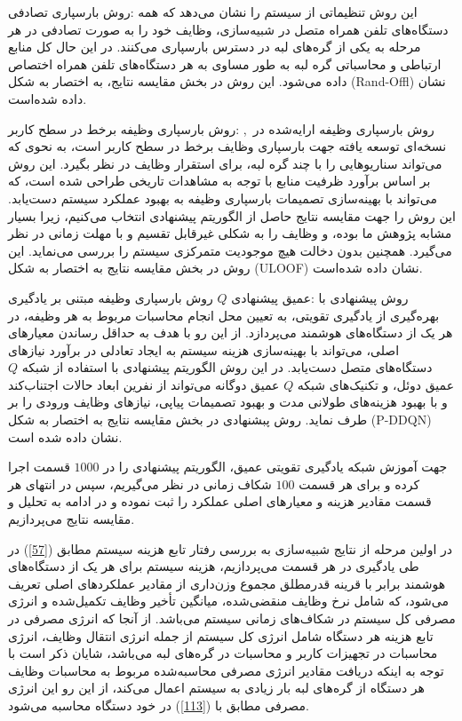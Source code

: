  $\textbf{روش بارسپاری تصادفی:}$ این روش تنظیماتی از سیستم را نشان می‌دهد که همه دستگاه‌های تلفن همراه متصل در شبیه‌سازی، وظایف خود را به صورت تصادفی در هر مرحله به یکی از گره‌های لبه در دسترس بارسپاری می‌کنند. در این حال کل منابع ارتباطی و محاسباتی گره لبه به طور مساوی به هر دستگاه‌های تلفن همراه اختصاص داده می‌شود. این روش در بخش مقایسه نتایج، به اختصار به شکل (Rand-Offl) نشان داده شده‌است. 

$\textbf{روش بارسپاری وظیفه برخط در سطح کاربر:}$
روش بارسپاری وظیفه ارایه‌شده در~\cite{neto2018uloof}, نسخه‌ای توسعه یافته جهت بارسپاری وظایف برخط در سطح کاربر است، به نحوی که می‌تواند سناریوهایی را با چند گره لبه، برای استقرار وظایف در نظر بگیرد. این روش بر اساس برآورد ظرفیت منابع با توجه به مشاهدات تاریخی طراحی شده است، که می‌تواند با بهینه‌سازی تصمیمات بارسپاری وظیفه به بهبود عملکرد سیستم دست‌یابد. این روش را جهت مقایسه نتایج حاصل از الگوریتم پیشنهادی انتخاب می‌کنیم، زیرا بسیار مشابه پژوهش ما بوده، و وظایف را به شکلی غیرقابل تقسیم و با مهلت زمانی در نظر می‌گیرد. همچنین بدون دخالت هیچ موجودیت متمرکزی سیستم را بررسی می‌نماید. این روش در بخش مقایسه  نتایج به اختصار به شکل (ULOOF) نشان داده شده‌است. 


 $\textbf{روش بارسپاری وظیفه مبتنی بر یادگیری $Q$ عمیق پیشنهادی:}$
روش پیشنهادی با بهره‌گیری از یادگیری تقویتی، به تعیین محل انجام محاسبات مربوط به هر وظیفه، در هر یک از دستگاه‌های هوشمند می‌پردازد. از این رو با هدف به حداقل رساندن معیارهای اصلی، می‌تواند با بهینه‌سازی هزینه سیستم به ایجاد تعادلی در برآورد نیازهای دستگاه‌های متصل دست‌یابد. در این روش الگوریتم پیشنهادی با استفاده از شبکه $Q$ عمیق دوئل، و تکنیک‌های شبکه $Q$ عمیق دوگانه می‌تواند از نفرین ابعاد حالات اجتناب‌کند و با بهبود هزینه‌های طولانی مدت و بهبود تصمیمات پیاپی، نیازهای وظایف ورودی را بر طرف نماید. روش پبشنهادی در بخش مقایسه نتایج به اختصار به شکل (P-DDQN) نشان داده شده است. 

جهت آموزش شبکه یادگیری تقویتی عمیق، الگوریتم پیشنهادی را در $1000$ قسمت اجرا کرده و برای هر قسمت $100$ شکاف زمانی در نظر می‌گیریم، سپس در انتهای هر قسمت مقادیر هزینه و معیارهای اصلی عملکرد را ثبت نموده و در ادامه به تحلیل و مقایسه نتایج می‌پردازیم.




در اولین مرحله از نتایج شبیه‌سازی به بررسی رفتار تابع هزینه سیستم مطابق (\ref{57}) در طی یادگیری در هر قسمت می‌پردازیم، هزینه سیستم برای هر یک از دستگاه‌های هوشمند برابر با قرینه قدرمطلق مجموع وزن‌داری از مقادیر عملکردهای اصلی تعریف می‌شود، که شامل نرخ وظایف منقضی‌شده، میانگین تأخیر وظایف تکمیل‌شده و انرژی مصرفی کل سیستم در شکاف‌های زمانی سیستم می‌باشد. از آنجا که انرژی مصرفی در تابع ‌هزینه هر دستگاه شامل انرژی کل سیستم از جمله انرژی انتقال وظایف، انرژی محاسبات در تجهیزات کاربر و محاسبات در گره‌های لبه می‌باشد، شایان ذکر است با توجه به اینکه دریافت مقادیر انرژی مصرفی محاسبه‌شده مربوط به محاسبات  وظایف هر دستگاه از گره‌های لبه بار زیادی به سیستم اعمال می‌کند، از این رو این انرژی مصرفی مطابق با (\ref{113}) در خود دستگاه‌ محاسبه می‌شود. 

